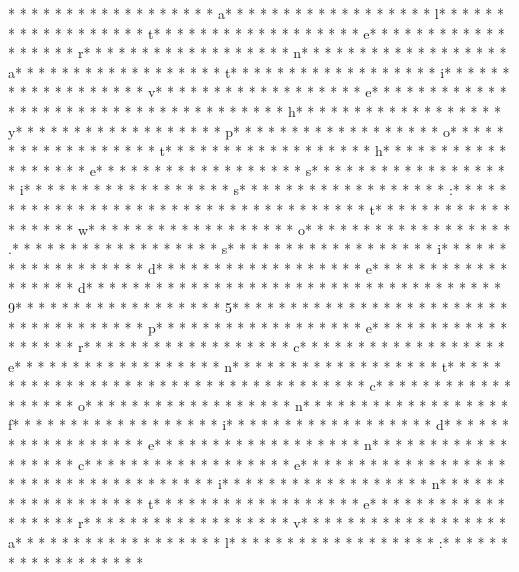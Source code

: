 * * *  * * *  * * *  *  * * *  *  * * *  * a* * *  * * *  * * *  *  * * *  *  * * *  * l* * *  * * *  * * *  *  * * *  *  * * *  * t* * *  * * *  * * *  *  * * *  *  * * *  * e* * *  * * *  * * *  *  * * *  *  * * *  * r* * *  * * *  * * *  *  * * *  *  * * *  * n* * *  * * *  * * *  *  * * *  *  * * *  * a* * *  * * *  * * *  *  * * *  *  * * *  * t* * *  * * *  * * *  *  * * *  *  * * *  * i* * *  * * *  * * *  *  * * *  *  * * *  * v* * *  * * *  * * *  *  * * *  *  * * *  * e* * *  * * *  * * *  *  * * *  *  * * *  *  * * *  * * *  * * *  *  * * *  *  * * *  * h* * *  * * *  * * *  *  * * *  *  * * *  * y* * *  * * *  * * *  *  * * *  *  * * *  * p* * *  * * *  * * *  *  * * *  *  * * *  * o* * *  * * *  * * *  *  * * *  *  * * *  * t* * *  * * *  * * *  *  * * *  *  * * *  * h* * *  * * *  * * *  *  * * *  *  * * *  * e* * *  * * *  * * *  *  * * *  *  * * *  * s* * *  * * *  * * *  *  * * *  *  * * *  * i* * *  * * *  * * *  *  * * *  *  * * *  * s* * *  * * *  * * *  *  * * *  *  * * *  * :* * *  * * *  * * *  *  * * *  *  * * *  *  * * *  * * *  * * *  *  * * *  *  * * *  * t* * *  * * *  * * *  *  * * *  *  * * *  * w* * *  * * *  * * *  *  * * *  *  * * *  * o* * *  * * *  * * *  *  * * *  *  * * *  * .* * *  * * *  * * *  *  * * *  *  * * *  * s* * *  * * *  * * *  *  * * *  *  * * *  * i* * *  * * *  * * *  *  * * *  *  * * *  * d* * *  * * *  * * *  *  * * *  *  * * *  * e* * *  * * *  * * *  *  * * *  *  * * *  * d* * *  * * *  * * *  *  * * *  *  * * *  * 
* * *  * * *  * * *  *  * * *  *  * * *  * 9* * *  * * *  * * *  *  * * *  *  * * *  * 5* * *  * * *  * * *  *  * * *  *  * * *  *  * * *  * * *  * * *  *  * * *  *  * * *  * p* * *  * * *  * * *  *  * * *  *  * * *  * e* * *  * * *  * * *  *  * * *  *  * * *  * r* * *  * * *  * * *  *  * * *  *  * * *  * c* * *  * * *  * * *  *  * * *  *  * * *  * e* * *  * * *  * * *  *  * * *  *  * * *  * n* * *  * * *  * * *  *  * * *  *  * * *  * t* * *  * * *  * * *  *  * * *  *  * * *  *  * * *  * * *  * * *  *  * * *  *  * * *  * c* * *  * * *  * * *  *  * * *  *  * * *  * o* * *  * * *  * * *  *  * * *  *  * * *  * n* * *  * * *  * * *  *  * * *  *  * * *  * f* * *  * * *  * * *  *  * * *  *  * * *  * i* * *  * * *  * * *  *  * * *  *  * * *  * d* * *  * * *  * * *  *  * * *  *  * * *  * e* * *  * * *  * * *  *  * * *  *  * * *  * n* * *  * * *  * * *  *  * * *  *  * * *  * c* * *  * * *  * * *  *  * * *  *  * * *  * e* * *  * * *  * * *  *  * * *  *  * * *  *  * * *  * * *  * * *  *  * * *  *  * * *  * i* * *  * * *  * * *  *  * * *  *  * * *  * n* * *  * * *  * * *  *  * * *  *  * * *  * t* * *  * * *  * * *  *  * * *  *  * * *  * e* * *  * * *  * * *  *  * * *  *  * * *  * r* * *  * * *  * * *  *  * * *  *  * * *  * v* * *  * * *  * * *  *  * * *  *  * * *  * a* * *  * * *  * * *  *  * * *  *  * * *  * l* * *  * * *  * * *  *  * * *  *  * * *  * :* * *  * * *  * * *  *  * * *  *  * * *  * 
